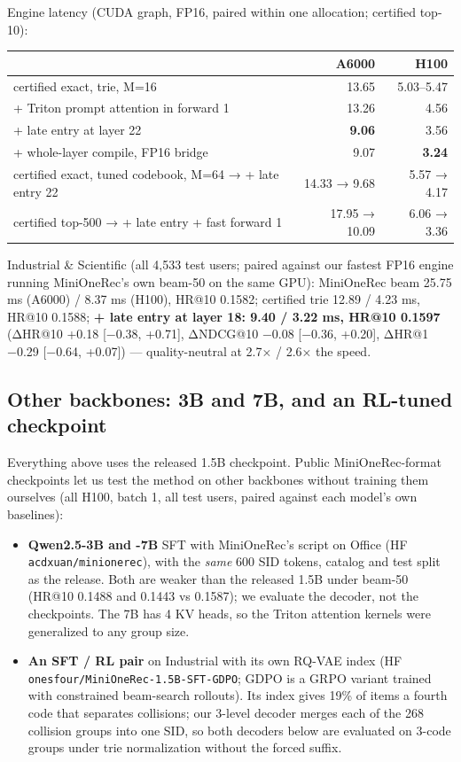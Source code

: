 \documentclass[11pt]{article}
\newcommand{\code}[1]{\texttt{#1}}
\begin{document}
Engine latency (CUDA graph, FP16, paired within one allocation; certified top-10):

{\small
\setlength{\tabcolsep}{4pt}
\begin{longtable}{lrr}
\toprule
 & A6000 & H100 \\
\midrule
\endhead
certified exact, trie, M=16 & 13.65 & 5.03–5.47 \\
+ Triton prompt attention in forward 1 & 13.26 & 4.56 \\
+ late entry at layer 22 & \textbf{9.06} & 3.56 \\
+ whole-layer compile, FP16 bridge & 9.07 & \textbf{3.24} \\
certified exact, tuned codebook, M=64 → + late entry 22 & 14.33 → 9.68 & 5.57 → 4.17 \\
certified top-500 → + late entry + fast forward 1 & 17.95 → 10.09 & 6.06 → 3.36 \\
\bottomrule
\end{longtable}
}

Industrial \& Scientific (all 4,533 test users; paired against our fastest FP16 engine running MiniOneRec's own beam-50 on the same GPU): MiniOneRec beam 25.75 ms (A6000) / 8.37 ms (H100), HR@10 0.1582; certified trie 12.89 / 4.23 ms, HR@10 0.1588; \textbf{+ late entry at layer 18: 9.40 / 3.22 ms, HR@10 0.1597} (ΔHR@10 +0.18 [−0.38, +0.71], ΔNDCG@10 −0.08 [−0.36, +0.20], ΔHR@1 −0.29 [−0.64, +0.07]) — quality-neutral at 2.7× / 2.6× the speed.

\subsection{Other backbones: 3B and 7B, and an RL-tuned checkpoint}\label{sec:5.3}

Everything above uses the released 1.5B checkpoint. Public MiniOneRec-format checkpoints let us test the method on other backbones without training them ourselves (all H100, batch 1, all test users, paired against each model's own baselines):

\begin{itemize}
\item \textbf{Qwen2.5-3B and -7B} SFT with MiniOneRec's script on Office (HF \code{acdxuan/\allowbreak{}minionerec}), with the \emph{same} 600 SID tokens, catalog and test split as the release. Both are weaker than the released 1.5B under beam-50 (HR@10 0.1488 and 0.1443 vs 0.1587); we evaluate the decoder, not the checkpoints. The 7B has 4 KV heads, so the Triton attention kernels were generalized to any group size.
\item \textbf{An SFT / RL pair} on Industrial with its own RQ-VAE index (HF \code{onesfour/\allowbreak{}MiniOneRec-{}1.5B-{}SFT-{}GDPO}; GDPO is a GRPO variant trained with constrained beam-search rollouts). Its index gives 19\% of items a fourth code that separates collisions; our 3-level decoder merges each of the 268 collision groups into one SID, so both decoders below are evaluated on 3-code groups under trie normalization without the forced suffix.
\end{itemize}
\end{document}
